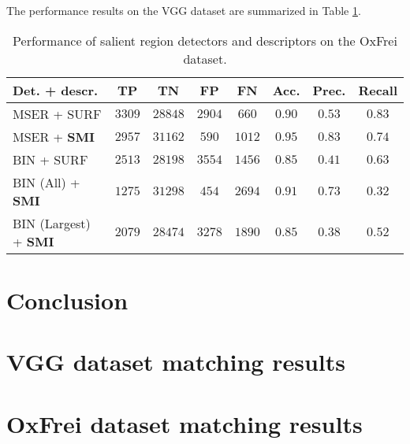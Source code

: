 \documentclass[a4paper,11pt]{article}
\begin{document}
The performance results on the VGG dataset are summarized in Table \ref{tab:oxfrei}.
\begin{table}[!ht]
\begin{center}
\begin{tabular}{|l||c|c|c|c|c|c|c|}

\hline
Det. + descr. & TP & TN & FP & FN & Acc. &Prec. &Recall\\
\hline
\hline
MSER + SURF & $3309$ & $28848$ & $2904$ & $660$ & $0.90$ & $0.53$ & $0.83$\\
\hline
MSER + \bf{SMI} & $2957$ & $31162$ & $590$ & $1012$ & $0.95$ &$0.83$ & $0.74$\\
\hline
BIN + SURF & $2513$ & $28198$ & $3554$ & $1456$ & $0.85$ &$0.41$ & $0.63$\\
\hline
BIN (All) + \bf{SMI}  & $1275$ & $31298$ & $454$ & $2694$ & $0.91$ &$0.73$ & $0.32$\\
\hline
BIN (Largest) + \bf{SMI}  & $2079$& $28474$ & $3278$ & $1890$ & $0.85$ & $0.38$ & $0.52$\\
\hline
\end{tabular}
\end{center}
\vspace{-20pt}
\caption{Performance of salient region detectors and descriptors on the OxFrei dataset.} \label{tab:oxfrei}
  \vspace{-10pt}
\end{table}

\section{Conclusion}





\appendix

\section{VGG dataset matching results }



\section{OxFrei dataset matching results }






\end{document}
